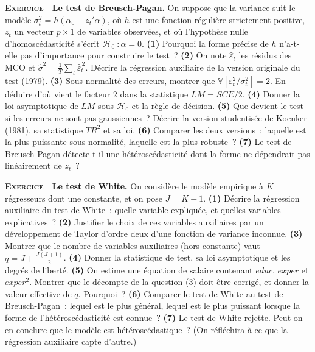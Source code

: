 \documentclass[10pt,a4paper,notitlepage]{article}
\newcounter{xnumber}
\newcommand{\exercice}{\refstepcounter{xnumber}\textsc{\textbf{Exercice}} \textbf{\thexnumber}\,\,}
\newcommand{\question}[1]{\textbf{(#1)}}
\begin{document}
\exercice\label{ex:breusch-pagan} \textbf{Le test de Breusch-Pagan.} On suppose que la variance suit le
modèle $\sigma_t^2 = h\left(\alpha_0 + z_t'\alpha\right)$, où $h$ est une
fonction régulière strictement positive, $z_t$ un vecteur $p\times 1$ de
variables observées, et où l'hypothèse nulle d'homoscédasticité s'écrit
$\mathcal H_0~: \alpha = 0$. \question{1} Pourquoi la forme précise de $h$
n'a-t-elle pas d'importance pour construire le test~? \question{2} On note
$\hat\varepsilon_t$ les résidus des MCO et
$\hat\sigma^2 = \frac1T\sum_t\hat\varepsilon_t^{\,2}$. Décrire la régression
auxiliaire de la version originale du test (1979). \question{3} Sous normalité
des erreurs, montrer que $\mathbb V[\varepsilon_t^2/\sigma_t^2] = 2$. En déduire
d'où vient le facteur $2$ dans la statistique $LM = SCE/2$. \question{4} Donner
la loi asymptotique de $LM$ sous $\mathcal H_0$ et la règle de décision.
\question{5} Que devient le test si les erreurs ne sont pas gaussiennes~?
Décrire la version studentisée de Koenker (1981), sa statistique $TR^2$ et sa
loi. \question{6} Comparer les deux versions~: laquelle est la plus puissante
sous normalité, laquelle est la plus robuste~? \question{7} Le test de
Breusch-Pagan détecte-t-il une hétéroscédasticité dont la forme ne dépendrait
pas linéairement de $z_t$~?\newline

\bigskip

\exercice\label{ex:white} \textbf{Le test de White.} On considère le modèle empirique à
$K$ régresseurs dont une constante, et on pose $J = K-1$. \question{1} Décrire
la régression auxiliaire du test de White~: quelle variable expliquée, et
quelles variables explicatives~? \question{2} Justifier le choix de ces
variables auxiliaires par un développement de Taylor d'ordre deux d'une fonction
de variance inconnue. \question{3} Montrer que le nombre de variables
auxiliaires (hors constante) vaut $q = J + \frac{J(J+1)}{2}$. \question{4}
Donner la statistique de test, sa loi asymptotique et les degrés de liberté.
\question{5} On estime une équation de salaire contenant $educ$, $exper$ et
$exper^2$. Montrer que le décompte de la question (3) doit être corrigé, et
donner la valeur effective de $q$. Pourquoi~? \question{6} Comparer le test de
White au test de Breusch-Pagan~: lequel est le plus général, lequel est le plus
puissant lorsque la forme de l'hétéroscédasticité est connue~? \question{7} Le
test de White rejette. Peut-on en conclure que le modèle est hétéroscédastique~?
(On réfléchira à ce que la régression auxiliaire capte d'autre.)\newline
\end{document}
